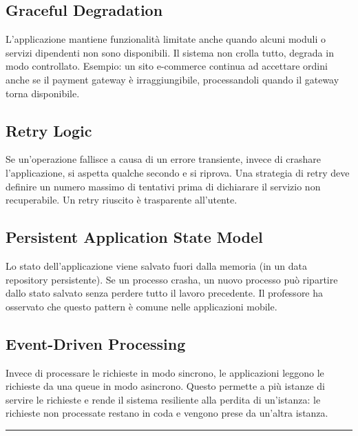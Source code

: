 \documentclass[
  italian,
  openany]{book}
\begin{document}
\subsection{Graceful Degradation}\label{graceful-degradation}

L'applicazione mantiene funzionalità limitate anche quando alcuni moduli
o servizi dipendenti non sono disponibili. Il sistema non crolla tutto,
degrada in modo controllato. Esempio: un sito e-commerce continua ad
accettare ordini anche se il payment gateway è irraggiungibile,
processandoli quando il gateway torna disponibile.

\subsection{Retry Logic}\label{retry-logic}

Se un'operazione fallisce a causa di un errore transiente, invece di
crashare l'applicazione, si aspetta qualche secondo e si riprova. Una
strategia di retry deve definire un numero massimo di tentativi prima di
dichiarare il servizio non recuperabile. Un retry riuscito è trasparente
all'utente.

\subsection{Persistent Application State
Model}\label{persistent-application-state-model}

Lo stato dell'applicazione viene salvato fuori dalla memoria (in un data
repository persistente). Se un processo crasha, un nuovo processo può
ripartire dallo stato salvato senza perdere tutto il lavoro precedente.
Il professore ha osservato che questo pattern è comune nelle
applicazioni mobile.

\subsection{Event-Driven Processing}\label{event-driven-processing}

Invece di processare le richieste in modo sincrono, le applicazioni
leggono le richieste da una queue in modo asincrono. Questo permette a
più istanze di servire le richieste e rende il sistema resiliente alla
perdita di un'istanza: le richieste non processate restano in coda e
vengono prese da un'altra istanza.

\begin{center}\rule{0.5\linewidth}{0.5pt}\end{center}
\end{document}
